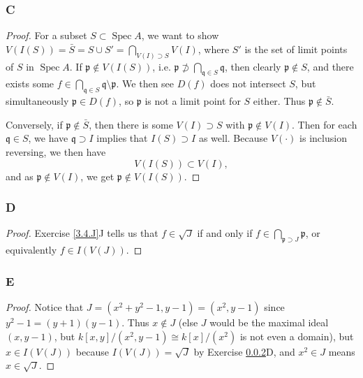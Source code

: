 \documentclass{article}
\newcommand{\frkp}{\mathfrak{p}}
\newcommand{\frkq}{\mathfrak{q}}
\DeclareMathOperator{\Spec}{\mathrm{Spec}}
\begin{document}
\subsubsection{C}\label{3.7.C}
\begin{proof}
    For a subset $S\subset \Spec A$, we want to show $V(I(S))=\bar S = S\cup S'=\bigcap_{V(I)\supset S} V(I)$, where $S'$ is the set of limit points of $S$ in $\Spec A$. If $\frkp\notin V(I(S))$, i.e. $\frkp \not \supset \bigcap_{\frkq \in S} \frkq$, then clearly $\frkp \notin S$, and there exists some $f\in \bigcap_{\frkq \in S} \frkq \setminus \frkp$. We then see $D(f)$ does not intersect $S$, but simultaneously $\frkp \in D(f)$, so $\frkp$ is not a limit point for $S$ either. Thus $\frkp \notin \bar S$.

    Conversely, if $\frkp \notin \bar S$, then there is some $V(I) \supset S$ with $\frkp \notin V(I)$. Then for each $\frkq \in S$, we have $\frkq \supset I$ implies that $I(S) \supset I$ as well. Because $V(\cdot)$ is inclusion reversing, we then have
    \[
    V(I(S))\subset V(I),
    \]
    and as $\frkp \notin V(I)$, we get $\frkp \notin V(I(S))$.
\end{proof}
\subsubsection{D}\label{3.7.D}
\begin{proof}
    Exercise \ref{3.4.J}J tells us that $f\in \sqrt{J}$ if and only if $f\in \bigcap_{\frkp \supset J} \frkp$, or equivalently $f\in I(V(J))$.
\end{proof}
\subsubsection{E}\label{3.7.E}
\begin{proof}
    Notice that $J=(x^2+y^2-1,y-1)=(x^2, y-1)$ since $y^2-1=(y+1)(y-1)$. Thus $x\notin J$ (else $J$ would be the maximal ideal $(x,y-1)$, but $k[x,y]/(x^2,y-1) \cong k[x]/(x^2)$ is not even a domain), but $x\in I(V(J))$ because $I(V(J))=\sqrt{J}$ by Exercise \ref{3.7.D}D, and $x^2 \in J$ means $x\in \sqrt{J}$.
\end{proof}
\end{document}
